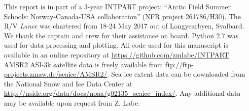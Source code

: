 \documentclass[draft,linenumbers]{agujournal}
\begin{document}
\acknowledgments
This report is in part of a 3-year INTPART project: ``Arctic Field Summer Schools: Norway-Canada-USA collaboration'' (NFR project 261786/H30). The R/V \textit{Lance} was chartered from 18-24 May 2017 out of Longyearbyen, Svalbard. We thank the captain and crew for their assistance on board. Python 2.7 was used for data processing and plotting. All code used for this manuscript is available in an online repository at \url{https://github.com/zmlabe/INTPART}. AMSR2 ASI-3k satellite data is freely available from \url{ftp://ftp-projects.zmaw.de/seaice/AMSR2/}. Sea ice extent data can be downloaded from the National Snow and Ice Data Center at \url{http://nsidc.org/data/docs/noaa/g02135_seaice_index/}. Any additional data may be available upon request from Z. Labe.









%
%
%
%
%
%
%
%
%
%
\end{document}
